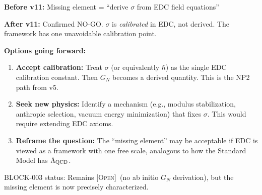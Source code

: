 \documentclass[11pt,a4paper]{article}
\newcommand{\Open}{\textsc{[Open]}}
\begin{document}
\begin{resultbox}
\textbf{Before v11:} Missing element = ``derive $\sigma$ from EDC field equations''

\textbf{After v11:} Confirmed NO-GO. $\sigma$ is \textit{calibrated} in EDC,
not derived. The framework has one unavoidable calibration point.

\textbf{Options going forward:}
\begin{enumerate}
\item \textbf{Accept calibration:} Treat $\sigma$ (or equivalently $\hbar$)
as the single EDC calibration constant. Then $G_N$ becomes a derived quantity.
This is the NP2 path from v5.

\item \textbf{Seek new physics:} Identify a mechanism (e.g., modulus stabilization,
anthropic selection, vacuum energy minimization) that fixes $\sigma$.
This would require extending EDC axioms.

\item \textbf{Reframe the question:} The ``missing element'' may be acceptable
if EDC is viewed as a framework with one free scale, analogous to how
the Standard Model has $\Lambda_{\rm QCD}$.
\end{enumerate}

BLOCK-003 status: Remains \Open\ (no ab initio $G_N$ derivation), but the
missing element is now precisely characterized.
\end{resultbox}
\end{document}
